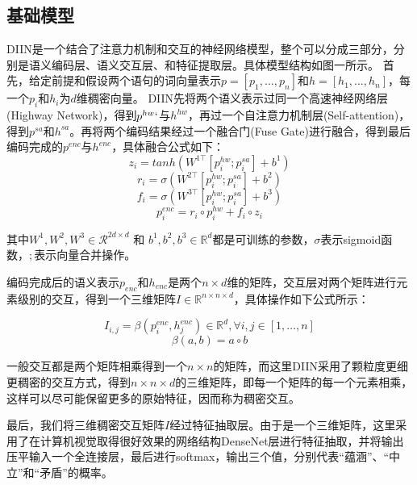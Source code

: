 \documentclass[UTF8,11pt,a4paper,nofonts]{ctexart}
\begin{document}
\subsection{基础模型}

DIIN是一个结合了注意力机制和交互的神经网络模型，整个可以分成三部分，分别是语义编码层、语义交互层、和特征提取层。具体模型结构如图一所示。
首先，给定前提和假设两个语句的词向量表示$p=[p_1,\dots,p_n]$和$h=[h_1, \dots, h_n]$，每一个$p_i$和$h_i$为$d$维稠密向量。
DIIN先将两个语义表示过同一个高速神经网络层(Highway Network)，得到$p^{hw}`$与$h^{hw}$，再过一个自注意力机制层(Self-attention)，得到$p^{sa}$和$h^{sa}$。再将两个编码结果经过一个融合门(Fuse Gate)进行融合，得到最后编码完成的$p^{enc}$与$h^{enc}$，具体融合公式如下：
\begin{equation}
z_i = tanh(W^{1\top}[p^{hw}_i;p^{sa}_i]+b^1)
\end{equation}
\begin{equation}
r_i = \sigma(W^{2\top}[p^{hw}_i;p^{sa}_i]+b^2)
\end{equation}
\begin{equation}
f_i = \sigma(W^{3\top}[p^{hw}_i;p^{sa}_i]+b^3)
\end{equation}
\begin{equation}
p^{enc}_i = r_i \circ p^{hw}_i + f_i \circ z_i
\end{equation}

其中$W^1, W^2, W^3 \in \mathcal{R}^{2d\times d}$ 和 $b^1, b^2, b^3 \in \mathbb{R}^d$都是可训练的参数，$\sigma$表示sigmoid函数，$;$表示向量合并操作。

编码完成后的语义表示$p_{enc}$和$h_{enc}$是两个$n\times d$维的矩阵，交互层对两个矩阵进行元素级别的交互，得到一个三维矩阵$I \in \mathbb{R}^{n\times n \times d}$，具体操作如下公式所示：

\begin{equation}
I_{i,j} = \beta(p^{enc}_i, h^{enc}_j) \in \mathbb{R}^d, \forall i, j \in [1,\dots,n]
\end{equation}
\begin{equation}
\beta(a, b) = a \circ b
\end{equation}

一般交互都是两个矩阵相乘得到一个$n\times n$的矩阵，而这里DIIN采用了颗粒度更细更稠密的交互方式，得到$n\times n \times d$的三维矩阵，即每一个矩阵的每一个元素相乘，这样可以尽可能保留更多的原始特征，因而称为稠密交互。

最后，我们将三维稠密交互矩阵$I$经过特征抽取层。由于是一个三维矩阵，这里采用了在计算机视觉取得很好效果的网络结构DenseNet层进行特征抽取，并将输出压平输入一个全连接层，最后进行softmax，输出三个值，分别代表“蕴涵”、“中立”和“矛盾”的概率。
\end{document}

